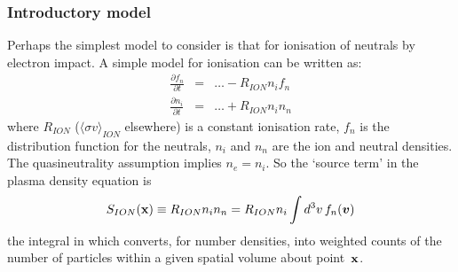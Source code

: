 \subsubsection{Introductory model}\label{sec:intromodel}
Perhaps the simplest model to consider is that for ionisation of neutrals by electron impact.
A simple model for ionisation can be written as:
\begin{eqnarray}
\frac{\partial f_{n}}{\partial t} & = & \ldots-R_{ION}n_{i}f_{n}\\
\frac{\partial n_{i}}{\partial t} & = & \ldots+R_{ION}n_{i}n_{n}
\end{eqnarray}
where $R_{ION}$ ($\langle\sigma v\rangle_{ION}$ elsewhere) is a constant ionisation rate, $f_{n}$
is the distribution function for the neutrals, $n_{i}$ and $n_{n}$
are the ion and neutral densities. The quasineutrality assumption implies
$n_{e}=n_{i}$. So the `source term' in the plasma density equation is
\begin{equation}
S_{ION}({\bf x})\equiv R_{ION}n_{i}n_{n}=R_{ION}n_{i}\int d^{3}v\,f_{n}(\boldsymbol{v})
\end{equation}
the integral in which converts, for number densities, into weighted counts of the number
of particles within a given spatial volume about point~${\bf x}$.

